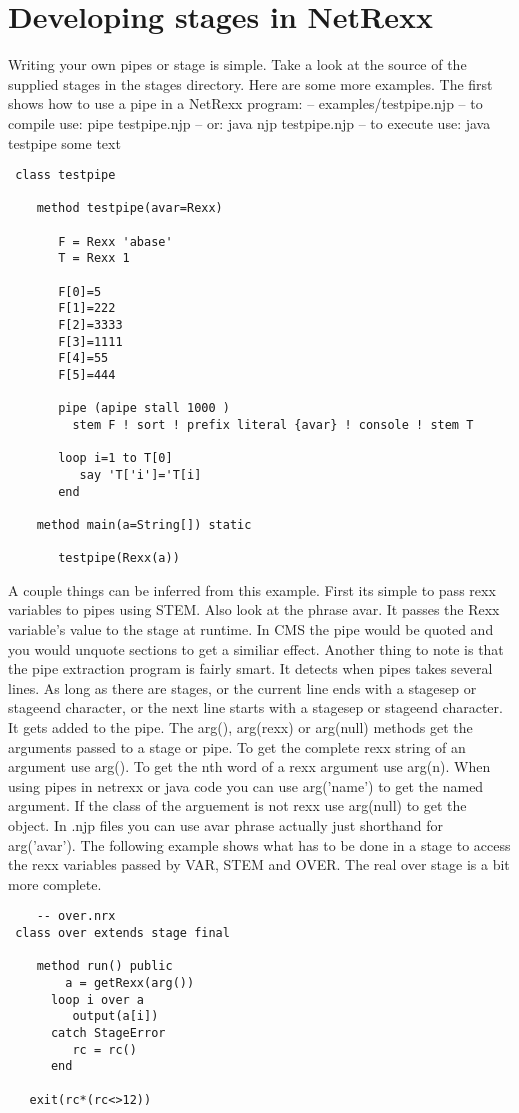 \chapter{Developing stages in NetRexx}
Writing your own pipes or stage is simple.  Take a look at the source of the supplied stages in the stages directory.  Here are some more examples.  The first shows how to use a pipe in a NetRexx program:
    -- examples/testpipe.njp
    -- to compile use: pipe testpipe.njp
    --             or: java njp testpipe.njp
    -- to execute use: java testpipe some text
\begin{lstlisting}
 class testpipe

    method testpipe(avar=Rexx)

       F = Rexx 'abase'
       T = Rexx 1

       F[0]=5
       F[1]=222
       F[2]=3333
       F[3]=1111
       F[4]=55
       F[5]=444

       pipe (apipe stall 1000 )
         stem F ! sort ! prefix literal {avar} ! console ! stem T

       loop i=1 to T[0]
          say 'T['i']='T[i]
       end

    method main(a=String[]) static

       testpipe(Rexx(a))
\end{lstlisting}
 A couple things can be inferred from this example.  First its simple to pass rexx variables to pipes using STEM.  Also look at the  phrase {avar}. It passes the Rexx variable's value to the stage at runtime.  In CMS the pipe would be quoted and you would unquote sections to get a similiar effect.
Another thing to note is that the pipe extraction program is fairly smart. It detects when pipes takes several lines.  As long as there are stages, or the current line ends with a stagesep or stageend character, or the next line starts with a stagesep or stageend character.  It gets added to the pipe.
The arg(), arg(rexx) or arg(null) methods get the arguments passed to a stage or pipe.  To get the complete rexx string of an argument use arg(). To get the nth word of a rexx argument use arg(n).  When using pipes in netrexx or java code you can use arg('name') to get the named argument. If the class of the arguement is not rexx use arg(null) to get the object.
In .njp files you can use {avar} phrase actually just shorthand for  arg('avar').
The following example shows what has to be done in a stage to access the rexx variables passed by VAR, STEM and OVER.  The real  over stage is a bit more complete.
\begin{lstlisting}
    -- over.nrx
 class over extends stage final

    method run() public
        a = getRexx(arg())
      loop i over a
         output(a[i])
      catch StageError
         rc = rc()
      end
    
   exit(rc*(rc<>12))
\end{lstlisting}
